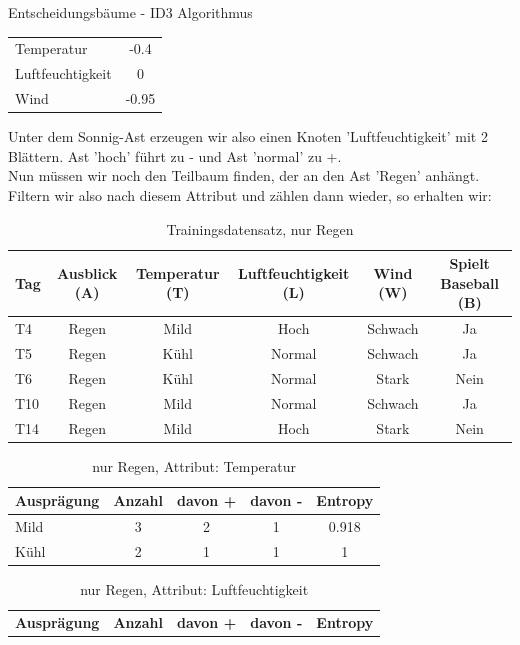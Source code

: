 \begin{task}[credit=16]{Entscheidungsbäume - ID3 Algorithmus}
\begin{subtask}[points=10,title=ID3 Algorithmus]
\begin{solution}
\begin{table}[H]
\begin{tabular}{l|c}
		\midrule
		Temperatur&-0.4\\
		Luftfeuchtigkeit & 0\\
		Wind&-0.95\\
		\bottomrule
	\end{tabular}
\end{table}
Unter dem Sonnig-Ast erzeugen wir also einen Knoten 'Luftfeuchtigkeit' mit 2 Blättern. Ast 'hoch' führt zu - und Ast 'normal' zu +.\\
Nun müssen wir noch den Teilbaum finden, der an den Ast 'Regen' anhängt. Filtern wir also nach diesem Attribut und zählen dann wieder, so erhalten wir:
\begin{table}[H]
	\centering
	\caption{Trainingsdatensatz, nur Regen}
	\begin{tabular}{l|c|c|c|c|c}
		\toprule
		\textbf{Tag} & \textbf{Ausblick (A)} & \textbf{Temperatur (T)}  & \textbf{Luftfeuchtigkeit (L)} & \textbf{Wind (W)}     & \textbf{Spielt Baseball (B)} \\
		\midrule
		T4  & Regen     & Mild        & Hoch             & Schwach  & Ja              \\
		T5  & Regen     & Kühl        & Normal           & Schwach  & Ja              \\
		T6  & Regen     & Kühl        & Normal           & Stark    & Nein            \\
		T10 & Regen     & Mild        & Normal           & Schwach  & Ja              \\
		T14 & Regen     & Mild        & Hoch             & Stark    & Nein            \\
		\bottomrule
	\end{tabular}
\end{table}
\begin{table}[H]
	\centering
	\caption{nur Regen, Attribut: Temperatur}
	\begin{tabular}{l|c|c|c|c}
		\toprule
		\textbf{Ausprägung} & \textbf{Anzahl} & \textbf{davon +}  & \textbf{davon -} &\textbf{Entropy} \\
		\midrule
		Mild & 3&2&1&0.918   \\
		Kühl & 2&1&1&1    \\
		\bottomrule
	\end{tabular}
\end{table}
\begin{table}[H]
	\centering
	\caption{nur Regen, Attribut: Luftfeuchtigkeit}
	\begin{tabular}{l|c|c|c|c}
		\toprule
		\textbf{Ausprägung} & \textbf{Anzahl} & \textbf{davon +}  & \textbf{davon -} &\textbf{Entropy} \\

\end{tabular}
\end{table}
\end{solution}
\end{subtask}
\end{task}
